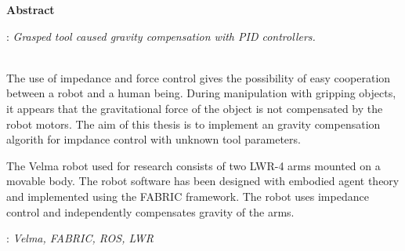 \vspace*{\baselineskip}
\begin{center}
	{\large\bfseries Abstract}\par\bigskip
\end{center}
: {\itshape Grasped tool caused gravity compensation with PID controllers.}
\\\\
{ 
	The use of impedance and force control gives the possibility of easy cooperation between a robot and a human being. During manipulation with gripping objects, it appears that the gravitational force of the object is not compensated by the robot motors. The aim of this thesis is to implement an gravity compensation algorith for impdance control with unknown tool parameters.
	
	The Velma robot used for research consists of two LWR-4 arms mounted on a movable body. The robot software has been designed with embodied agent theory and implemented using the FABRIC framework. The robot uses impedance control and independently compensates gravity of the arms.
}\par
\vspace*{1\baselineskip}
: {\itshape Velma, FABRIC, ROS, LWR}

\clearpage\mbox{}\newpage



\clearpage\mbox{}\newpage




